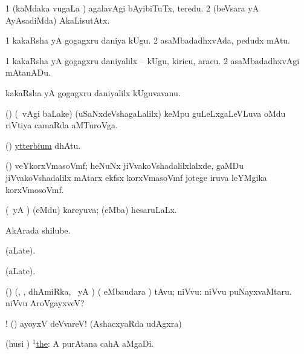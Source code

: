 \bentry
{} 
\gl{\kirxvi} 
\bmng
\bnum
\num{1} (kaMdaka \mo vugaLa \vi) agalavAgi bAyibiTuTx, teredu. 
\num{2} (beVsara yA AyAsadiMda) AkaLisutAtx.
\enum
\emng
\eentry

\bentry
{} 
\gl{\nA} 
\bmng
\bnum
\num{1} kakaRsha yA gogagxru daniya kUgu. 
\num{2} asaMbadadhxvAda, pedudx  mAtu.
\enum
\emng
\eentry

\bentry
{} 
\gl{\akirx} 
\bmng
\bnum
\num{1} kakaRsha yA gogagxru daniyalilx -- kUgu, kiricu, aracu. 
\num{2} asaMbadadhxvAgi mAtanADu.
\enum
\emng 
\eentry

\bentry
{} 
\gl{\nA} 
\bmng
kakaRsha yA gogagxru daniyalilx kUguvavanu.
\emng
\eentry

\bentry
{} 
\gl{\nA} 
\bmng
(\bava) (\sA\  \Eva vAgi baLake) (uSaNxdeVshagaLalilx) keMpu guLeLxgaLeVLuva oMdu riVtiya camaRda aMTuroVga.
\emng
\eentry

\bentry
{}
\gl{\saMkeV}
\bmng
(\ravi) \hyperlink{ytterbium}{ytterbium} dhAtu.
\emng
\eentry

\bentry
{} 
\gl{\nA}
\bmng
(\jiVvi) veYkorxVmasoVmf; heNuNx jiVvakoVshadalilxlalxde, gaMDu jiVvakoVshadalilx mAtarx  ekfsx korxVmasoVmf jotege iruva leYMgika korxVmosoVmf.
\emng
\eentry

\bentry
{} 
\gl{\gu}
\bmng
(\pArxparx\ yA \hA) (eMdu) kareyuva; (eMba) hesaruLaLx.
\emng
\eentry

\bentry
{} 
\gl{\nA} 
\bmng
{} AkArada shilube.
\emng
\eentry

\bentry
{}
\gl{\saMkiSx}
\bmng
{} (aLate).
\emng
\eentry

\bentry
{}
\gl{\saMkiSx}
\bmng
{} (aLate).
\emng
\eentry

\bentry
{} 
\gl{\sanA} 
\bmng
(\bava) (\kAparx, \pArxparx, dhAmiRka, \pArxM\ yA \hA)
( eMbaudara \bava) tAvu; niVvu:   niVvu puNayxvaMtaru.  niVvu AroVgayxveV?
\emng

\noindent
\gl{\pagu}
\bmng
{}! (\hA) ayoyxV deVvareV! (AshacxyaRda udAgxra)
\emng
\eentry

\bentry
{} 
\gl{\gu}
\bmng
(husi \pArxparx) \hyperref{kandict_t.pdf}{T}{the(1)}{$^1$the}:  A purAtana cahA aMgaDi. 
\emng 
\eentry

